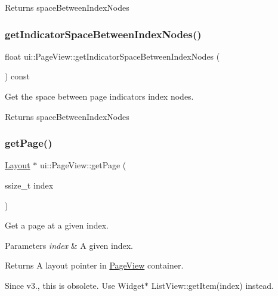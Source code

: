 \begin{DoxyReturn}{Returns}
space\+Between\+Index\+Nodes 
\end{DoxyReturn}
\mbox{\label{classui_1_1PageView_a5ed4633cd13e1d9be2d195de1e1be077}} 
\subsubsection{\texorpdfstring{get\+Indicator\+Space\+Between\+Index\+Nodes()}{getIndicatorSpaceBetweenIndexNodes()}\hspace{0.1cm}{\footnotesize\ttfamily [2/2]}}
{\footnotesize\ttfamily float ui\+::\+Page\+View\+::get\+Indicator\+Space\+Between\+Index\+Nodes (\begin{DoxyParamCaption}{ }\end{DoxyParamCaption}) const}



Get the space between page indicator\textquotesingle{}s index nodes. 

\begin{DoxyReturn}{Returns}
space\+Between\+Index\+Nodes 
\end{DoxyReturn}
\mbox{\label{classui_1_1PageView_a0f13817440be39068e46a3c597466268}} 
\subsubsection{\texorpdfstring{get\+Page()}{getPage()}\hspace{0.1cm}{\footnotesize\ttfamily [1/2]}}
{\footnotesize\ttfamily \hyperlink{classui_1_1Layout}{Layout} $\ast$ ui\+::\+Page\+View\+::get\+Page (\begin{DoxyParamCaption}\item[{ssize\+\_\+t}]{index }\end{DoxyParamCaption})}



Get a page at a given index. 


\begin{DoxyParams}{Parameters}
{\em index} & A given index. \\
\hline
\end{DoxyParams}
\begin{DoxyReturn}{Returns}
A layout pointer in \hyperlink{classui_1_1PageView}{Page\+View} container.
\end{DoxyReturn}
Since v3., this is obsolete. Use {\ttfamily Widget$\ast$ List\+View\+::get\+Item(index)} instead. \mbox{\label{classui_1_1PageView_a82ba1073c82a126465158090fad60698}} 
